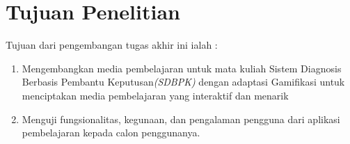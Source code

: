 
\section{Tujuan Penelitian}

Tujuan dari pengembangan tugas akhir ini ialah :
\begin{enumerate}
	\item Mengembangkan media pembelajaran untuk mata kuliah Sistem Diagnosis Berbasis Pembantu Keputusan\textit{(SDBPK)} dengan adaptasi Gamifikasi untuk menciptakan media pembelajaran yang interaktif dan menarik
	\item Menguji fungsionalitas, kegunaan, dan pengalaman pengguna dari aplikasi pembelajaran kepada calon penggunanya.
\end{enumerate}
